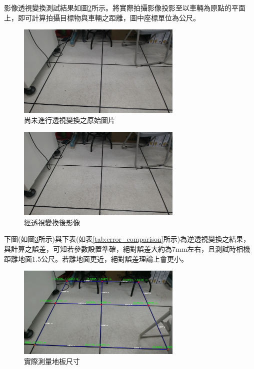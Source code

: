\documentclass[12pt]{article}       %
\begin{document}
影像透視變換測試結果如圖\ref{fig:36}所示。將實際拍攝影像投影至以車輛為原點的平面上，即可計算拍攝目標物與車輛之距離，圖中座標單位為公尺。
\begin{figure}[H]
    \centering
    \includegraphics[width=0.7\textwidth]{35.jpg}     %
    \caption{尚未進行透視變換之原始圖片}    %
    \label{fig:35}    %
\end{figure}
\begin{figure}[H]
    \centering
    \includegraphics[width=0.7\textwidth]{35.jpg}     %
    \caption{經透視變換後影像}    %
    \label{fig:36}    %
\end{figure}

下圖(如圖\ref{fig:frame_with_points_real}所示)與下表(如表\ref{tab:error_comparison}所示)為逆透視變換之結果，
與計算之誤差，可知若參數設置準確，絕對誤差大約為7mm左右，且測試時相機距離地面1.5公尺。若離地面更近，絕對誤差理論上會更小。

\begin{figure}[H]
    \centering
    \includegraphics[width=0.7\textwidth]{frame_with_points_real.jpg}     %
    \caption{實際測量地板尺寸}    %
    \label{fig:frame_with_points_real}    %
\end{figure}
\end{document}
